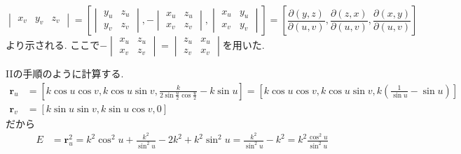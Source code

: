 \documentclass[a4j,dvipdfmx]{jsarticle}
\begin{document}
\begin{qparts}
\begin{qlist}
\begin{equation*}
\begin{vmatrix}
                        x_v & y_v & z_v
                        \end{vmatrix}=\left[
                            \begin{vmatrix}
                                y_u & z_u \\
                                y_v & z_v
                            \end{vmatrix},
                            -\begin{vmatrix}
                                x_u & z_u \\
                                x_v & z_v
                            \end{vmatrix},
                            \begin{vmatrix}
                                x_u & y_u \\
                                x_v & y_v
                            \end{vmatrix}
                        \right]=\left[\frac{\partial (y,z)}{\partial (u,v)},\frac{\partial (z,x)}{\partial (u,v)},\frac{\partial (x,y)}{\partial (u,v)}\right]              
                \end{equation*}
                より示される. ここで$\displaystyle
                -\begin{vmatrix}
                    x_u & z_u \\
                    x_v & z_v
                \end{vmatrix}=
                \begin{vmatrix}
                    z_u & x_u \\
                    z_v & x_v
                \end{vmatrix}$を用いた.
            \end{qlist}
            \clearpage
            \qpart IIの手順のように計算する.
            \begin{align*}
                \bm{r}_u&=\left[k\cos u\cos v,k\cos u\sin v,\frac{k}{2\sin\frac{u}{2}\cos\frac{u}{2}}-k\sin u\right]=\left[k\cos u\cos v,k\cos u\sin v,k\left(\frac{1}{\sin u}-\sin u\right)\right]\\
                \bm{r}_v&=\left[k\sin u\sin v,k\sin u\cos v,0\right]
            \end{align*}
            だから
            \begin{align*}
                E&=\bm{r}_u^2=k^2\cos^2 u + \frac{k^2}{\sin^2 u}-2k^2+k^2\sin^2 u=\frac{k^2}{\sin^2 u}-k^2=k^2\frac{\cos^2 u}{\sin^2 u}\\

\end{align*}
\end{qparts}
\end{document}
